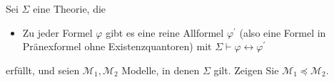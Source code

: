 
\begin{exercise}[146]
Sei $\Sigma$ eine Theorie, die
\begin{itemize}
  \item Zu jeder Formel $\varphi$ gibt es eine reine Allformel $\varphi^{\prime}$
  (also eine Formel in Pränexformel ohne Existenzquantoren) mit
  $\Sigma \vdash \varphi \leftrightarrow \varphi^{\prime}$
\end{itemize}
erfüllt, und seien $\mathscr{M}_1,\mathscr{M}_2$ Modelle, in denen $\Sigma$ gilt.
Zeigen Sie $\mathscr{M}_1 \preccurlyeq \mathscr{M}_2$.
\end{exercise}


\begin{solution}
\phantom{}
\end{solution}

